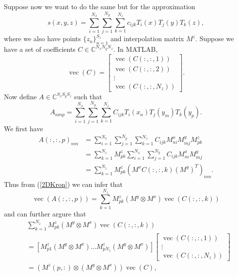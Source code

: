 \documentclass{article}
\newcommand{\C}{\mathbb{C}}
\DeclareMathOperator{\vecm}{vec}
\begin{document}
Suppose now we want to do the same but for the approximation 
\begin{equation}
s(x,y,z) = \sum_{i=1}^{N_x} \sum_{j=1}^{N_y} \sum_{k=1}^{N_z} c_{ijk} T_i(x)T_j(y)T_k(z),
\end{equation}
where we also have points $\{z_n\}_{n=1}^{S_z}$ and interpolation matrix $M^{z}$. Suppose we have a set of coefficients $C \in \C^{N_x N_y N_z}$. In MATLAB,
\begin{equation}
\vecm(C) = 
\begin{bmatrix}
\vecm(C(:,:,1))	\\
\vecm(C(:,:,2))	\\
\vdots \\
\vecm(C(:,:,N_z))
\end{bmatrix}.
\end{equation}
Now define $A \in \C^{S_x S_y S_z}$ such that
\begin{equation}
A_{nmp} = \sum_{i=1}^{N_x} \sum_{j=1}^{N_y}  \sum_{k=1}^{N_z}  C_{ijk} T_i(x_n)T_j(y_m)T_k(y_p).
\end{equation}
We first have
\begin{equation}
	\begin{aligned}
		A(:,:,p)_{nm} &= \sum_{i=1}^{N_x} \sum_{j=1}^{N_y}  \sum_{k=1}^{N_z} C_{ijk} M_{ni}^x M_{mj}^y M_{pk}^z \\
		 		 &= \sum_{k=1}^{N_z} M_{pk}^z  \sum_{i=1}^{N_x} \sum_{j=1}^{N_y} C_{ijk} M_{ni}^x M_{mj}^y \\
		 		 &= \sum_{k=1}^{N_z} M_{pk}^z (M^x C(:,:,k) (M^y)^T)_{nm}.
	\end{aligned}
\end{equation}
Thus from (\ref{2DKron}) we can infer that
\begin{equation}
\vecm(A(:,:,p)) = \sum_{k=1}^{N_z} M_{pk}^z (M^y \otimes M^x) \vecm(C(:,:,k))
\end{equation}
and can further argure that
\begin{equation}
	\begin{aligned}
		& \sum_{k=1}^{N_z} M_{pk}^z (M^y \otimes M^x) \vecm(C(:,:,k)) \\
		&= [M_{p1}^z (M^y \otimes M^x) \dots M_{p N_z}^z (M^y \otimes M^x)] \begin{bmatrix}
			\vecm(C(:,:,1)) \\
			\vdots \\
			\vecm(C(:,:,N_z))
		\end{bmatrix} \\
		&= (M^z(p,:) \otimes (M^y \otimes M^x)) \vecm(C)	,
	\end{aligned}
\end{equation}
\end{document}

